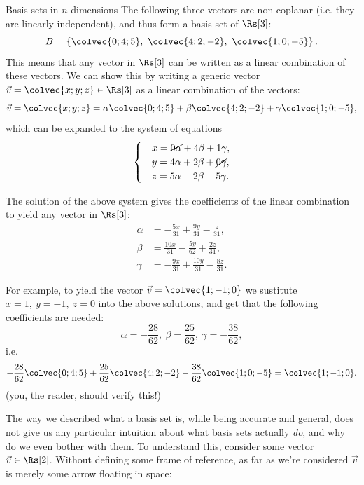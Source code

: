 \begin{example}{Basis sets in $n$ dimensions}{}
	The following three vectors are non coplanar (i.e. they are linearly independent), and thus form a basis set of $\Rs[3]$:
	\[
		B = \left\{ \colvec{0;4;5},\ \colvec{4;2;-2},\ \colvec{1;0;-5} \right\}.
	\]
	This means that any vector in $\Rs[3]$ can be written as a linear combination of these vectors. We can show this by writing a generic vector $\vec{v}=\colvec{x;y;z}\in\Rs[3]$ as a linear combination of the vectors:
	\[
		\vec{v} = \colvec{x;y;z} = \alpha\colvec{0;4;5} + \beta\colvec{4;2;-2} + \gamma\colvec{1;0;-5},
	\]
	which can be expanded to the system of equations
	\[
		\begin{cases}
			& x = \cancel{0\alpha}+4\beta+1\gamma,\\
			& y = 4\alpha+2\beta+\cancel{0\gamma},\\
			& z = 5\alpha-2\beta-5\gamma.
		\end{cases}
	\]

	The solution of the above system gives the coefficients of the linear combination to yield any vector in $\Rs[3]$:
	\begin{align*}
		\alpha &= -\frac{5x}{31} + \frac{9y}{31} - \frac{z}{31},\\
		\beta  &= \frac{10x}{31} - \frac{5y}{62} + \frac{2z}{31},\\
		\gamma &= -\frac{9x}{31} + \frac{10y}{31} - \frac{8z}{31}.
	\end{align*}

	For example, to yield the vector $\vec{v}=\colvec{1;-1;0}$ we sustitute $x=1,\ y=-1,\ z=0$ into the above solutions, and get that the following coefficients are needed:
	\[
		\alpha=-\frac{28}{62},\ \beta=\frac{25}{62},\ \gamma=-\frac{38}{62},
	\]
	i.e.
	\[
		-\frac{28}{62}\colvec{0;4;5} + \frac{25}{62}\colvec{4;2;-2} -\frac{38}{62}\colvec{1;0;-5} = \colvec{1;-1;0}.
	\]
	(you, the reader, should verify this!)
\end{example}

The way we described what a basis set is, while being accurate and general, does not give us any particular intuition about what basis sets actually \textit{do}, and why do we even bother with them. To understand this, consider some vector $\vec{v}\in\Rs[2]$. Without defining some frame of reference, as far as we're considered $\vec{v}$ is merely some arrow floating in space:

\begin{center}
\end{center}

